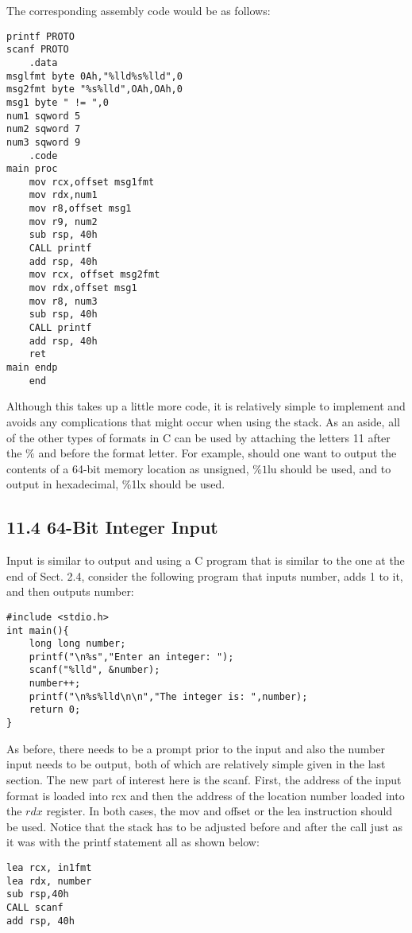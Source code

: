 \documentclass[10pt]{article}
\begin{document}
The corresponding assembly code would be as follows:

\begin{verbatim}
printf PROTO
scanf PROTO
    .data
msglfmt byte 0Ah,"%lld%s%lld",0
msg2fmt byte "%s%lld",OAh,OAh,0
msg1 byte " != ",0
num1 sqword 5
num2 sqword 7
num3 sqword 9
    .code
main proc
    mov rcx,offset msg1fmt
    mov rdx,num1
    mov r8,offset msg1
    mov r9, num2
    sub rsp, 40h
    CALL printf
    add rsp, 40h
    mov rcx, offset msg2fmt
    mov rdx,offset msg1
    mov r8, num3
    sub rsp, 40h
    CALL printf
    add rsp, 40h
    ret
main endp
    end
\end{verbatim}

Although this takes up a little more code, it is relatively simple to implement and avoids any complications that might occur when using the stack. As an aside, all of the other types of formats in C can be used by attaching the letters 11 after the $\%$ and before the format letter. For example, should one want to output the contents of a 64-bit memory location as unsigned, $\% 1 \mathrm{lu}$ should be used, and to output in hexadecimal, \%1lx should be used.

\subsection*{11.4 64-Bit Integer Input}
Input is similar to output and using a C program that is similar to the one at the end of Sect. 2.4, consider the following program that inputs number, adds 1 to it, and then outputs number:

\begin{verbatim}
#include <stdio.h>
int main(){
    long long number;
    printf("\n%s","Enter an integer: ");
    scanf("%lld", &number);
    number++;
    printf("\n%s%lld\n\n","The integer is: ",number);
    return 0;
}
\end{verbatim}

As before, there needs to be a prompt prior to the input and also the number input needs to be output, both of which are relatively simple given in the last section. The new part of interest here is the scanf. First, the address of the input format is loaded into rcx and then the address of the location number loaded into the $r d x$ register. In both cases, the mov and offset or the lea instruction should be used. Notice that the stack has to be adjusted before and after the call just as it was with the printf statement all as shown below:

\begin{verbatim}
lea rcx, in1fmt
lea rdx, number
sub rsp,40h
CALL scanf
add rsp, 40h
\end{verbatim}
\end{document}
